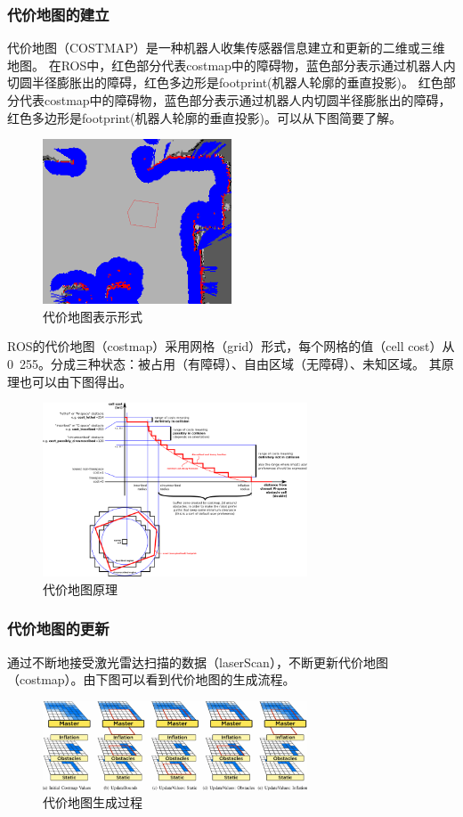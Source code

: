 \documentclass[cs4size,a4paper]{ctexart}
\numberwithin{equation}{section}
\numberwithin{table}{section}
\numberwithin{figure}{section}
\begin{document}
\subsubsection{代价地图的建立}
代价地图（COSTMAP）是一种机器人收集传感器信息建立和更新的二维或三维地图。
在ROS中，红色部分代表costmap中的障碍物，蓝色部分表示通过机器人内切圆半径膨胀出的障碍，红色多边形是footprint(机器人轮廓的垂直投影)。
红色部分代表costmap中的障碍物，蓝色部分表示通过机器人内切圆半径膨胀出的障碍，红色多边形是footprint(机器人轮廓的垂直投影)。可以从下图简要了解。
\begin{figure}[H]
        \centering
        \includegraphics[width=0.5\textwidth]{figure/costmap.png}
        \caption{代价地图表示形式}
\end{figure}
ROS的代价地图（costmap）采用网格（grid）形式，每个网格的值（cell cost）从0~255。分成三种状态：被占用（有障碍）、自由区域（无障碍）、未知区域。
其原理也可以由下图得出。
\begin{figure}[H]
        \centering
        \includegraphics[width=0.7\textwidth]{figure/occupy.png}
        \caption{代价地图原理}
\end{figure}
\subsubsection{代价地图的更新}
通过不断地接受激光雷达扫描的数据（laserScan），不断更新代价地图（costmap）。由下图\cite{6942562}可以看到代价地图的生成流程。
\begin{figure}[H]
        \centering
        \includegraphics[width=0.7\textwidth]{figure/occupy1.png}
        \caption{代价地图生成过程}
\end{figure}
\end{document}
